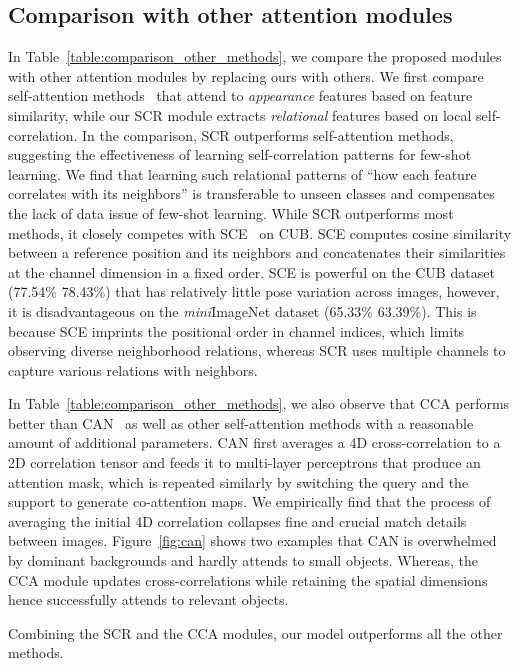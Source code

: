 \documentclass[10pt,twocolumn,letterpaper]{article}
\newcommand{\itmini}{\textit{mini}}
\newcommand{\abbself}{SCR\xspace}
\newcommand{\abbcross}{CCA\xspace}
\begin{document}
\subsection{Comparison with other attention modules}
In Table~\ref{table:comparison_other_methods}, we compare the proposed modules with other attention modules by replacing ours with others.
We first compare self-attention methods~\cite{nlsa, lsa, se} that attend to \textit{appearance} features based on feature similarity, while our \abbself module extracts \textit{relational} features based on local self-correlation.
In the comparison, \abbself outperforms self-attention methods, suggesting the effectiveness of learning self-correlation patterns for few-shot learning.
We find that learning such relational patterns of ``how each feature correlates with its neighbors'' is transferable to unseen classes and compensates the lack of data issue of few-shot learning.
While \abbself outperforms most methods, it closely competes with SCE~\cite{dccnet} on CUB.
SCE computes cosine similarity between a reference position and its neighbors and concatenates their similarities at the channel dimension in a fixed order.
SCE is powerful on the CUB dataset (77.54\%  78.43\%) that has relatively little pose variation across images, however, it is disadvantageous on the \itmini ImageNet dataset (65.33\%  63.39\%).
This is because SCE imprints the positional order in channel indices, which limits observing diverse neighborhood relations, whereas \abbself uses multiple channels to capture various relations with neighbors.

In Table~\ref{table:comparison_other_methods}, we also observe that \abbcross performs better than CAN~\cite{can} as well as other self-attention methods with a reasonable amount of additional parameters.
CAN first averages a 4D cross-correlation to a 2D correlation tensor and feeds it to multi-layer perceptrons that produce an attention mask, which is repeated similarly by switching the query and the support to generate co-attention maps.
We empirically find that the process of averaging the initial 4D correlation collapses fine and crucial match details between images.
Figure~\ref{fig:can} shows two examples that CAN is overwhelmed by dominant backgrounds and hardly attends to small objects.
Whereas, the \abbcross module updates cross-correlations while retaining the spatial dimensions hence successfully attends to relevant objects.

Combining the \abbself and the \abbcross modules, our model outperforms all the other methods. 
\end{document}
